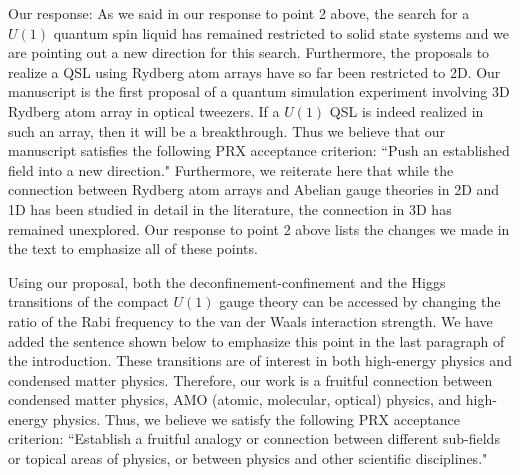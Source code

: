 \documentclass[
onecolumn,
superscriptaddress,
longbibliography,
nofootinbib,
 amsmath,amssymb,
 aps,
prb
]{revtex4-2}
\newcommand{\commentJS}[1]{\textcolor{blue}{\footnotesize{JS: #1}}}
\newcommand{\response}[1]{\textcolor{Mulberry}{#1}}
\begin{document}
\begin{enumerate}
\response{Our response: As we said in our response to point 2 above, the search for a $U(1)$ quantum spin liquid has remained restricted to solid state systems and we are pointing out a new direction for this search. Furthermore, the proposals to realize a QSL using Rydberg atom arrays have so far been restricted to 2D. Our manuscript is the first proposal of a quantum simulation experiment involving 3D Rydberg atom array in optical tweezers. If a $U(1)$ QSL is indeed realized in such an array, then it will be a breakthrough. Thus we believe that our manuscript satisfies the following PRX acceptance criterion: ``Push an established field into a new direction." Furthermore, we reiterate here that while the connection between Rydberg atom arrays and Abelian gauge theories in 2D and 1D has been studied in detail in the literature, the connection in 3D has remained unexplored. Our response to point 2 above lists the changes we made in the text to emphasize all of these points.}


\response{Using our proposal, both the deconfinement-confinement and the Higgs transitions of the compact $U(1)$ gauge theory can be accessed by changing the ratio of the Rabi frequency to the van der Waals interaction strength. We have added the sentence shown below to emphasize this point in the last paragraph of the introduction. These transitions are of interest in both high-energy physics and condensed matter physics. Therefore, our work is a fruitful connection between condensed matter physics, AMO (atomic, molecular, optical) physics,  and high-energy physics. Thus, we believe we satisfy the following PRX acceptance criterion: ``Establish a fruitful analogy or connection between different sub-fields or topical areas of physics, or between physics and other scientific disciplines."}


\end{enumerate}
\end{document}
